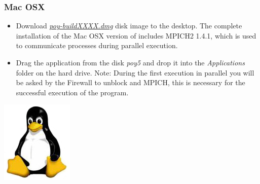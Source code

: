\begin{flushleft}
\begin{minipage}[t]{0.88\textwidth}
	   	\subsubsection*{Mac OSX}
	\end{minipage}
	            \begin{itemize}
			\item Download
            \href{http://research.amnh.org/scicomp/projects/poy.php}{\emph{poy-buildXXXX.dmg}} disk image 
             to the desktop. The complete installation of the Mac OSX version of \poy includes MPICH2 1.4.1, 
             which is used to communicate processes during parallel execution.
            		\item Drag the \poy application from the disk \emph{poy5} and drop it into the \emph{Applications}
            folder on the hard drive.  Note: During the first execution in parallel you will be asked by the Firewall to 
            unblock \poy and MPICH, this is necessary for the successful execution of the program.
		\end{itemize}

	\begin{minipage}[c]{0.074\textwidth}
   		\includegraphics[width=\textwidth]{doc/figures/figlogolinux.jpg}
	\end{minipage}
	\,
	\begin{minipage}[t]{0.88\textwidth}

\end{minipage}
\end{flushleft}
